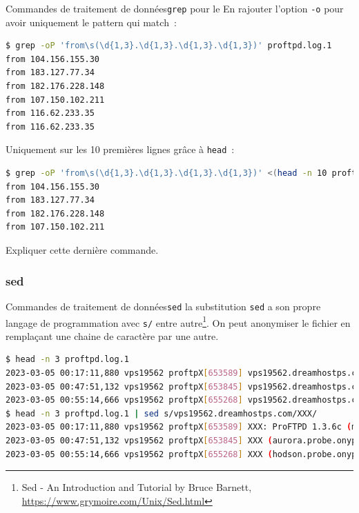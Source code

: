 \documentclass{beamer}
\begin{document}
    \begin{frame}[fragile]{Commandes de traitement de données}{\lstinline{grep} pour le }
        En rajouter l'option \lstinline{-o} pour avoir uniquement le pattern qui match~:
        \begin{lstlisting}[language=bash]
$ grep -oP 'from\s(\d{1,3}.\d{1,3}.\d{1,3}.\d{1,3})' proftpd.log.1
from 104.156.155.30
from 183.127.77.34
from 182.176.228.148
from 107.150.102.211
from 116.62.233.35
from 116.62.233.35
        \end{lstlisting}
        Uniquement sur les 10 premières lignes grâce à \lstinline{head}~:
        \begin{lstlisting}[language=bash]
$ grep -oP 'from\s(\d{1,3}.\d{1,3}.\d{1,3}.\d{1,3})' <(head -n 10 proftpd.log.1)
from 104.156.155.30
from 183.127.77.34
from 182.176.228.148
from 107.150.102.211
        \end{lstlisting}
        Expliquer cette dernière commande.
    \end{frame}

    \subsubsection{sed}\label{subsubsec:sed}
    \begin{frame}[fragile]{Commandes de traitement de données}{\lstinline{sed} la substitution}
        \lstinline{sed} a son propre langage de programmation avec \lstinline{s/} entre autre\footnote{\label{sed}Sed - An Introduction and Tutorial by Bruce Barnett, \url{https://www.grymoire.com/Unix/Sed.html}}.
        \bigbreak
        On peut anonymiser le fichier en remplaçant une chaine de caractère par une autre.
        \begin{lstlisting}[language=bash,basicstyle=\tiny\ttfamily]
$ head -n 3 proftpd.log.1
2023-03-05 00:17:11,880 vps19562 proftpX[653589] vps19562.dreamhostps.com: ProFTPD 1.3.6c (maint) (built Thu Feb 27 2020 19:34:56 UTC) standalone mode STARTUP
2023-03-05 00:47:51,132 vps19562 proftpX[653845] vps19562.dreamhostps.com (aurora.probe.onyphe.net[142.4.218.114]): USER anonymous: no such user found from aurora.probe.onyphe.net [142.4.218.114] to~::ffff:66.33.201.239:21
2023-03-05 00:55:14,666 vps19562 proftpX[655268] vps19562.dreamhostps.com (hodson.probe.onyphe.net[178.32.197.87]): USER anonymous: no such user found from hodson.probe.onyphe.net [178.32.197.87] to~::ffff:66.33.201.239:21
$ head -n 3 proftpd.log.1 | sed s/vps19562.dreamhostps.com/XXX/
2023-03-05 00:17:11,880 vps19562 proftpX[653589] XXX: ProFTPD 1.3.6c (maint) (built Thu Feb 27 2020 19:34:56 UTC) standalone mode STARTUP
2023-03-05 00:47:51,132 vps19562 proftpX[653845] XXX (aurora.probe.onyphe.net[142.4.218.114]): USER anonymous: no such user found from aurora.probe.onyphe.net [142.4.218.114] to~::ffff:66.33.201.239:21
2023-03-05 00:55:14,666 vps19562 proftpX[655268] XXX (hodson.probe.onyphe.net[178.32.197.87]): USER anonymous: no such user found from hodson.probe.onyphe.net [178.32.197.87] to~::ffff:66.33.201.239:21
        \end{lstlisting}
    \end{frame}
\end{document}
